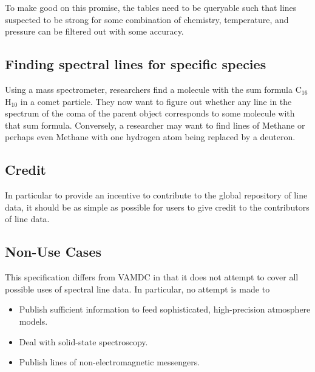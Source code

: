 \documentclass[11pt,a4paper]{ivoa}
\begin{document}
To make good on this promise, the tables need to be queryable such that
lines suspected to be strong for some combination of chemistry,
temperature, and pressure can be filtered out with some accuracy.


\subsection{Finding spectral lines for specific species}

Using a mass spectrometer, researchers find a molecule with the
sum formula C$_{16}$H$_{10}$  in a comet particle.  They now want to
figure out whether any line in the spectrum of the coma of the parent
object corresponds to some molecule with that sum formula.
Conversely, a researcher may want to find lines of Methane or perhaps
even Methane with one hydrogen atom being replaced by a deuteron.


\subsection{Credit}

In particular to provide an incentive to contribute to the global
repository of line data, it should be as simple as possible for users to
give credit to the contributors of line data.


\subsection{Non-Use Cases}

This specification differs from VAMDC in that it does not attempt to
cover all possible uses of spectral line data.  In particular, no
attempt is made to

\begin{itemize}
\item Publish sufficient information to feed sophisticated,
high-precision atmosphere models.
\item Deal with solid-state spectroscopy.
\item Publish lines of non-electromagnetic messengers.
\end{itemize}
\end{document}
